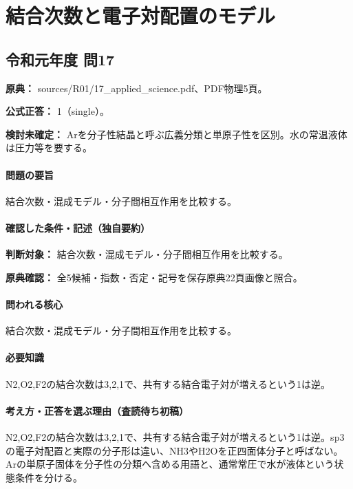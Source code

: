 \section{結合次数と電子対配置のモデル}

\subsection{令和元年度 問17}
\label{q:r01-reg-applied-17}

\noindent\textbf{原典：} sources/R01/17\_applied\_science.pdf、PDF物理5頁。

\textbf{公式正答：} 1（single）。

\par\textbf{検討未確定：} Arを分子性結晶と呼ぶ広義分類と単原子性を区別。水の常温液体は圧力等を要する。

\paragraph{問題の要旨} 結合次数・混成モデル・分子間相互作用を比較する。

\paragraph{確認した条件・記述（独自要約）}\mbox{}\par

\noindent\textbf{判断対象：} 結合次数・混成モデル・分子間相互作用を比較する。\par

\noindent\textbf{原典確認：} 全5候補・指数・否定・記号を保存原典22頁画像と照合。\par

\paragraph{問われる核心} 結合次数・混成モデル・分子間相互作用を比較する。

\paragraph{必要知識} N2,O2,F2の結合次数は3,2,1で、共有する結合電子対が増えるという1は逆。

\paragraph{考え方・正答を選ぶ理由（査読待ち初稿）} N2,O2,F2の結合次数は3,2,1で、共有する結合電子対が増えるという1は逆。sp3の電子対配置と実際の分子形は違い、NH3やH2Oを正四面体分子と呼ばない。Arの単原子固体を分子性の分類へ含める用語と、通常常圧で水が液体という状態条件を分ける。

